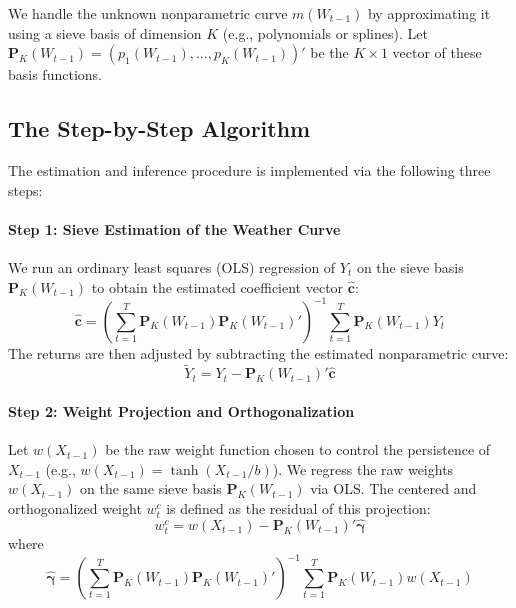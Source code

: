 \documentclass{article}
\begin{document}
We handle the unknown nonparametric curve $m(W_{t-1})$ by approximating it using a sieve basis of dimension $K$ (e.g., polynomials or splines). Let $\bm{P}_K(W_{t-1}) = (p_1(W_{t-1}), \dots, p_K(W_{t-1}))'$ be the $K \times 1$ vector of these basis functions.

\subsection{The Step-by-Step Algorithm}

The estimation and inference procedure is implemented via the following three steps:

\paragraph{Step 1: Sieve Estimation of the Weather Curve}
We run an ordinary least squares (OLS) regression of $Y_t$ on the sieve basis $\bm{P}_K(W_{t-1})$ to obtain the estimated coefficient vector $\widehat{\bm{c}}$:
\begin{equation}
    \widehat{\bm{c}} = \left( \sum_{t=1}^T \bm{P}_K(W_{t-1}) \bm{P}_K(W_{t-1})' \right)^{-1} \sum_{t=1}^T \bm{P}_K(W_{t-1}) Y_t
\end{equation}
The returns are then adjusted by subtracting the estimated nonparametric curve:
\begin{equation}
    \widetilde{Y}_t = Y_t - \bm{P}_K(W_{t-1})'\widehat{\bm{c}}
\end{equation}

\paragraph{Step 2: Weight Projection and Orthogonalization}
Let $w(X_{t-1})$ be the raw weight function chosen to control the persistence of $X_{t-1}$ (e.g., $w(X_{t-1}) = \tanh(X_{t-1}/b)$). We regress the raw weights $w(X_{t-1})$ on the same sieve basis $\bm{P}_K(W_{t-1})$ via OLS. The centered and orthogonalized weight $w^c_t$ is defined as the residual of this projection:
\begin{equation}
    w^c_t = w(X_{t-1}) - \bm{P}_K(W_{t-1})'\widehat{\bm{\gamma}}
\end{equation}
where
\begin{equation}
    \widehat{\bm{\gamma}} = \left( \sum_{t=1}^T \bm{P}_K(W_{t-1}) \bm{P}_K(W_{t-1})' \right)^{-1} \sum_{t=1}^T \bm{P}_K(W_{t-1}) w(X_{t-1})
\end{equation}
\end{document}

